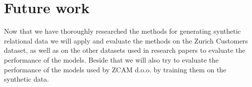 \documentclass[fleqn,moreauthors,10pt]{ds_report}
\begin{document}


\section*{Future work}
Now that we have thoroughly researched the methods for generating synthetic relational data we will apply and evaluate the methods on the Zurich Customers dataset, as well as on the other datasets used in research papers to evaluate the performance of the models. Beside that we will also try to evaluate the performance of the models used by ZCAM d.o.o. by training them on the synthetic data.






% 
% 
\end{document}
